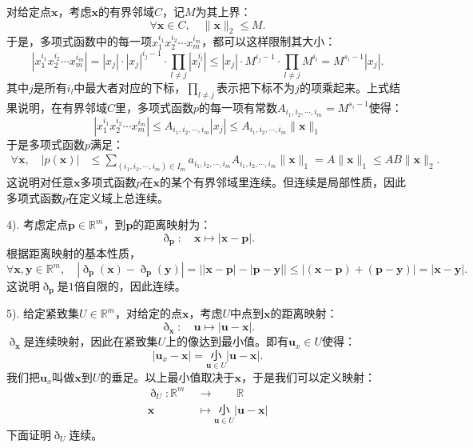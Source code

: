 \documentclass[12pt,UTF8,fontset=none]{ctexbook}
\begin{document}
\begin{so}
    对给定点$\mathbf{x}$，考虑$\mathbf{x}$的有界邻域$C$，记$M$为其上界：
    $$ \forall \mathbf{x}\in C, \quad \|\mathbf{x}\|_2 \leqslant M.$$
    于是，多项式函数中的每一项$x_1^{i_1} x_2^{i_2}\cdots x_m^{i_m}$，都可以这样限制其大小：
    $$ \left|x_1^{i_1} x_2^{i_2}\cdots x_m^{i_m}\right| = |x_j|\cdot |x_j|^{i_j-1} \cdot \prod_{l\neq j} \left|x_l^{i_l}\right| \leqslant |x_j| \cdot M^{i_j-1} \cdot\prod_{l\neq j} M^{i_l} = M^{s_i - 1} |x_j| . $$
    其中$j$是所有$i_l$中最大者对应的下标，$\prod_{l\neq j}$表示把下标不为$j$的项乘起来。上式结果说明，在有界邻域$C$里，多项式函数$p$的每一项有常数$A_{i_1, i_2, \cdots, i_m} = M^{s_i - 1}$使得：
    $$  \left|x_1^{i_1} x_2^{i_2}\cdots x_m^{i_m}\right| \leqslant A_{i_1, i_2, \cdots, i_m} |x_j| \leqslant A_{i_1, i_2, \cdots, i_m} \|\mathbf{x}\|_1 $$
    于是多项式函数$p$满足：
    \begin{align*}
        \forall \mathbf{x}, \quad |p(\mathbf{x})| &\leqslant \sum_{(i_1,i_2,\cdots, i_m)\in I_m} a_{i_1, i_2, \cdots, i_m}A_{i_1, i_2, \cdots, i_m}\|\mathbf{x}\|_1 = A\|\mathbf{x}\|_1 \leqslant AB\|\mathbf{x}\|_2.
    \end{align*}
    这说明对任意$\mathbf{x}$多项式函数$p$在$\mathbf{x}$的某个有界邻域里连续。但连续是局部性质，因此多项式函数$p$在定义域上总连续。

    4). 考虑定点$\mathbf{p}\in\mathbb{R}^m$，到$\mathbf{p}$的距离映射为：
    $$ \eth_{\mathbf{p}}: \quad \mathbf{x}\mapsto |\mathbf{x} - \mathbf{p}|.$$
    根据距离映射的基本性质，
    $$ \forall \mathbf{x}, \mathbf{y} \in \mathbb{R}^m, \quad |\eth_{\mathbf{p}}(\mathbf{x}) - \eth_{\mathbf{p}}(\mathbf{y})| =\big| |\mathbf{x} - \mathbf{p}| - |\mathbf{p} - \mathbf{y}| \big| \leqslant |(\mathbf{x} - \mathbf{p}) + (\mathbf{p} - \mathbf{y})| = |\mathbf{x} - \mathbf{y}|. $$
    这说明$\eth_{\mathbf{p}}$是$1$倍自限的，因此连续。

    5). 给定紧致集$U\in\mathbb{R}^m$，对给定的点$\mathbf{x}$，考虑$U$中点到$\mathbf{x}$的距离映射：
    $$ \eth_{\mathbf{x}}: \quad \mathbf{u}\mapsto |\mathbf{u} - \mathbf{x}|.$$
    $\eth_{\mathbf{x}}$是连续映射，因此在紧致集$U$上的像达到最小值。即有$\mathbf{u}_x\in U$使得：
    $$ |\mathbf{u}_x - \mathbf{x}| = \underset{\mathbf{u}\in U}{\text{小}} |\mathbf{u} - \mathbf{x}| .$$
    我们把$\mathbf{u}_x$叫做$\mathbf{x}$到$U$的垂足。以上最小值取决于$\mathbf{x}$，于是我们可以定义映射：
    \begin{align*}
        \eth_{U} : \mathbb{R}^m\; &\rightarrow \qquad \mathbb{R} \\
        \mathbf{x} \quad &\mapsto \underset{\mathbf{u}\in U}{\text{小}} |\mathbf{u} - \mathbf{x}|
    \end{align*}
    下面证明$\eth_{U}$连续。


\end{so}
\end{document}
